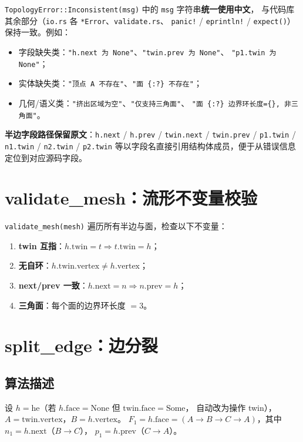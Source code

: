 \documentclass[11pt,a4paper]{article}
\begin{document}
\texttt{TopologyError::Inconsistent(msg)} 中的 \texttt{msg} 字符串\textbf{统一使用中文}，
与代码库其余部分（\texttt{io.rs} 各 \texttt{*Error}、\texttt{validate.rs}、
\texttt{panic!} / \texttt{eprintln!} / \texttt{expect()}）保持一致。例如：
\begin{itemize}
  \item 字段缺失类：\texttt{"h.next 为 None"}、\texttt{"twin.prev 为 None"}、
        \texttt{"p1.twin 为 None"}；
  \item 实体缺失类：\texttt{"顶点 A 不存在"}、\texttt{"面 \{:?\} 不存在"}；
  \item 几何/语义类：\texttt{"挤出区域为空"}、\texttt{"仅支持三角面"}、
        \texttt{"面 \{:?\} 边界环长度=\{\}, 非三角面"}。
\end{itemize}
\textbf{半边字段路径保留原文}：\texttt{h.next} / \texttt{h.prev} / \texttt{twin.next} /
\texttt{twin.prev} / \texttt{p1.twin} / \texttt{n1.twin} / \texttt{n2.twin} /
\texttt{p2.twin} 等以字段名直接引用结构体成员，便于从错误信息定位到对应源码字段。

\section{validate\_mesh：流形不变量校验}

\texttt{validate\_mesh(mesh)} 遍历所有半边与面，检查以下不变量：

\begin{enumerate}
  \item \textbf{twin 互指}：$h.\mathrm{twin} = t \Rightarrow t.\mathrm{twin} = h$；
  \item \textbf{无自环}：$h.\mathrm{twin}.\mathrm{vertex} \neq h.\mathrm{vertex}$；
  \item \textbf{next/prev 一致}：$h.\mathrm{next} = n \Rightarrow n.\mathrm{prev} = h$；
  \item \textbf{三角面}：每个面的边界环长度 $= 3$。
\end{enumerate}

\section{split\_edge：边分裂}

\subsection{算法描述}

设 $h = \mathrm{he}$（若 $h.\mathrm{face} = \mathrm{None}$ 但 $\mathrm{twin}.\mathrm{face} = \mathrm{Some}$，
自动改为操作 twin），$A = \mathrm{twin}.\mathrm{vertex}$，$B = h.\mathrm{vertex}$。
$F_1 = h.\mathrm{face} = (A \to B \to C \to A)$，其中 $n_1 = h.\mathrm{next}$（$B \to C$），
$p_1 = h.\mathrm{prev}$（$C \to A$）。
\end{document}
